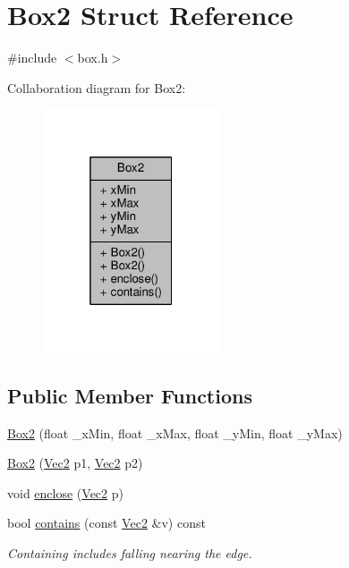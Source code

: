 \hypertarget{structBox2}{}\section{Box2 Struct Reference}
\label{structBox2}


{\ttfamily \#include $<$box.\+h$>$}



Collaboration diagram for Box2\+:\nopagebreak
\begin{figure}[H]
\begin{center}
\leavevmode
\includegraphics[width=148pt]{structBox2__coll__graph}
\end{center}
\end{figure}
\subsection*{Public Member Functions}
\begin{DoxyCompactItemize}
\item 
\hyperlink{structBox2_a6aa87f2d8b412ea27e6d21e6d14ea82e}{Box2} (float \+\_\+x\+Min, float \+\_\+x\+Max, float \+\_\+y\+Min, float \+\_\+y\+Max)
\item 
\hyperlink{structBox2_a5c4aa39e6462fdd31744eac9118b85a2}{Box2} (\hyperlink{vec_8h_a871640c4eb6057d21b25824c55250629}{Vec2} p1, \hyperlink{vec_8h_a871640c4eb6057d21b25824c55250629}{Vec2} p2)
\item 
void \hyperlink{structBox2_a7c79861eb4a94933f7facebfb53d44b2}{enclose} (\hyperlink{vec_8h_a871640c4eb6057d21b25824c55250629}{Vec2} p)
\item 
bool \hyperlink{structBox2_ad32f112b01ce71919b93b7bda4aec775}{contains} (const \hyperlink{vec_8h_a871640c4eb6057d21b25824c55250629}{Vec2} \&v) const 
\begin{DoxyCompactList}\small\item\em Containing includes falling nearing the edge. \end{DoxyCompactList}\end{DoxyCompactItemize}
